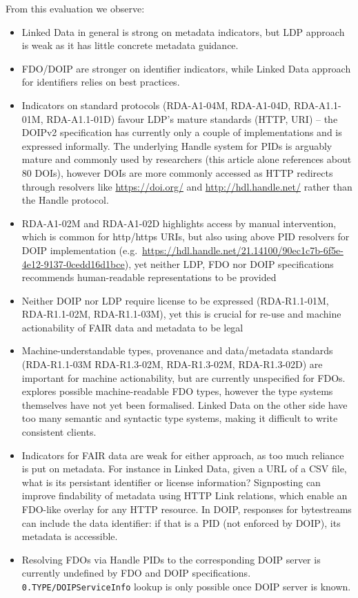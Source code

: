 From this evaluation we observe:

\begin{itemize}
\item
  Linked Data in general is strong on metadata indicators, but LDP approach is weak as it has little concrete metadata guidance.
\item
  FDO/DOIP are stronger on identifier indicators, while Linked Data approach for identifiers relies on best practices. 
\item
  Indicators on standard protocols (RDA-A1-04M, RDA-A1-04D, RDA-A1.1-01M, RDA-A1.1-01D) favour LDP's mature standards (HTTP, URI) -- the DOIPv2 specification \cite{DONA 2018} has currently only a couple of implementations and is expressed informally. The underlying Handle system for PIDs is arguably mature and commonly used by researchers (this article alone references about 80 DOIs), however DOIs are more commonly accessed as HTTP redirects through resolvers like \url{https://doi.org/} and \url{http://hdl.handle.net/} rather than the Handle protocol.
\item
  RDA-A1-02M and RDA-A1-02D highlights access by manual intervention, which is common for http/https URIs, but also using above PID resolvers for DOIP implementation  (e.g.~\url{https://hdl.handle.net/21.14100/90ec1c7b-6f5e-4e12-9137-0cedd16d1bce}), yet neither LDP, FDO nor DOIP specifications recommends human-readable representations to be provided
\item
  Neither DOIP nor LDP require license to be expressed (RDA-R1.1-01M, RDA-R1.1-02M, RDA-R1.1-03M), yet this is crucial for re-use and machine actionability of FAIR data and metadata to be legal
\item
  Machine-understandable types, provenance and data/metadata standards (RDA-R1.1-03M RDA-R1.3-02M, RDA-R1.3-02M, RDA-R1.3-02D) are important for machine actionability, but are currently unspecified for FDOs. \cite{fdo-ImplAttributesTypesProfiles} explores possible machine-readable FDO types, however the type systems themselves have not yet been formalised. Linked Data on the other side have too many semantic and syntactic type systems, making it difficult to write consistent clients.
\item
  Indicators for FAIR data are weak for either approach, as too much reliance is put on metadata. For instance in Linked Data, given a URL of a CSV file, what is its persistant identifier or license information? Signposting \cite{vandesompel2015} can improve findability of metadata using HTTP Link relations, which enable an FDO-like overlay for any HTTP resource. In DOIP, responses for bytestreams can include the data identifier: if that is a PID (not enforced by DOIP), its metadata is accessible.
\item
  Resolving FDOs via Handle PIDs to the corresponding DOIP server is currently undefined by FDO and DOIP specifications. \texttt{0.TYPE/DOIPServiceInfo} lookup is only possible once DOIP server is known.
\end{itemize}


